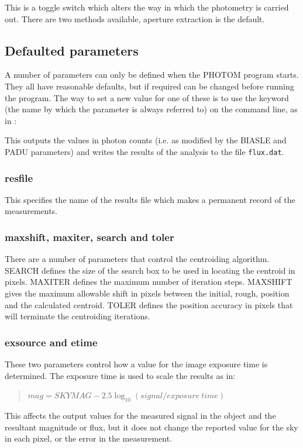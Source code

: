 \documentclass[twoside,11pt,nolof]{starlink}
\begin{document}
This is a toggle switch which alters the way in which the photometry
is carried out. There are two methods available, aperture extraction is
the default.

\subsection{Defaulted parameters}

A number of parameters can only be defined when the PHOTOM program
starts. They all have reasonable defaults, but if required can be
changed before running the program. The way to set a new value for one
of these is to use the keyword (the name by which the parameter is
always referred to) on the command line, as in :
\begin{terminalv}
\end{terminalv}
This outputs the values in photon counts (i.e. as modified by the
BIASLE and PADU parameters) and writes the results of the analysis to
the file \texttt{flux.dat}.

\subsubsection{resfile}

This specifies the name of the results file which makes a permanent record
of the measurements.

\subsubsection{maxshift, maxiter, search and toler}

There are a number of parameters that control the centroiding algorithm.
SEARCH defines the size of the search box to be used in locating the
centroid in pixels. MAXITER defines the maximum number of iteration steps.
MAXSHIFT gives the maximum allowable shift in pixels between the initial,
rough, position and the calculated centroid. TOLER defines the position
accuracy in pixels that will terminate the centroiding iterations.

\subsubsection{exsource and etime}

These two parameters control how a value for the image exposure time
is determined. The exposure time is used to scale the results as in:
\begin{quote}
$mag = SKYMAG - 2.5 \log_{10} ( signal / exposure~time)$
\end{quote}
This affects the output values for the measured signal in the object
and the resultant magnitude or flux, but it does not change the
reported value for the sky in each pixel, or the error in the
measurement.
\end{document}
